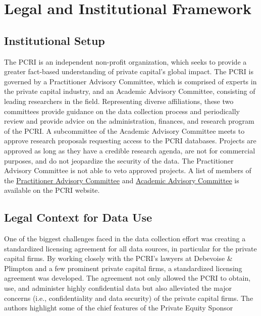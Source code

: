 \hypertarget{legal-and-institutional-framework-2}{%
\section{Legal and Institutional Framework}\label{legal-and-institutional-framework-2}}

\hypertarget{institutional-setup-2}{%
\subsection{Institutional Setup}\label{institutional-setup-2}}

The PCRI is an independent non-profit organization, which seeks to provide a greater fact-based understanding of private capital's global impact. The PCRI is governed by a Practitioner Advisory Committee, which is comprised of experts in the private capital industry, and an Academic Advisory Committee, consisting of leading researchers in the field. Representing diverse affiliations, these two committees provide guidance on the data collection process and periodically review and provide advice on the administration, finances, and research program of the PCRI. A subcommittee of the Academic Advisory Committee meets to approve research proposals requesting access to the PCRI databases. Projects are approved as long as they have a credible research agenda, are not for commercial purposes, and do not jeopardize the security of the data. The Practitioner Advisory Committee is not able to veto approved projects. A list of members of the \href{http://privatecapitalresearchinstitute.org/advisory-committee.php}{Practitioner Advisory Committee} and \href{http://www.privatecapitalresearchinstitute.org/academic-advisory-board.php}{Academic Advisory Committee} is available on the PCRI website.

\hypertarget{legal-context-for-data-use-2}{%
\subsection{Legal Context for Data Use}\label{legal-context-for-data-use-2}}

One of the biggest challenges faced in the data collection effort was creating a standardized licensing agreement for all data sources, in particular for the private capital firms. By working closely with the PCRI's lawyers at Debevoise \& Plimpton and a few prominent private capital firms, a standardized licensing agreement was developed. The agreement not only allowed the PCRI to obtain, use, and administer highly confidential data but also alleviated the major concerns (i.e., confidentiality and data security) of the private capital firms. The authors highlight some of the chief features of the Private Equity Sponsor

